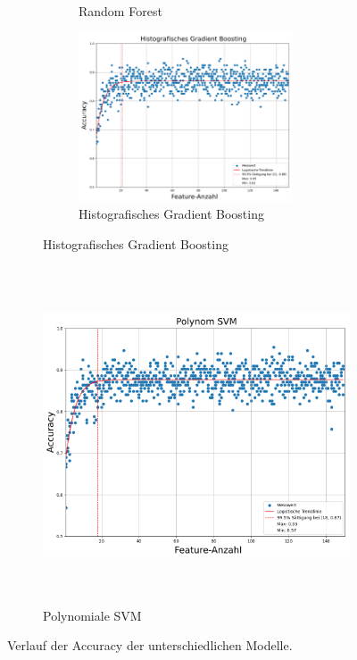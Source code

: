 \begin{figure}[p]
\begin{subfigure}[b]{0.9\textwidth}
\begin{subfigure}[b]{0.49\textwidth}
             \caption{Random Forest}
         \end{subfigure}
         \hfill
         \begin{subfigure}[b]{0.49\textwidth}
             \centering
             \includegraphics[width=\textwidth, height=5cm]{img/Plots/Modell Auswahl/Hist Gradien Boosting - Accuracy Plot.png}
             \caption{Histografisches Gradient Boosting}
         \end{subfigure}
     \end{subfigure}
     \begin{subfigure}[b]{0.9\textwidth}
         \centering
         \includegraphics[width=\textwidth, height=10cm]{img/Plots/Modell Auswahl/poly SVM - Accuracy Plot.png}
         \caption{Polynomiale SVM}
     \end{subfigure}
     \caption{Verlauf der Accuracy der unterschiedlichen Modelle.}
     \label{fig:plotCompModel}
\end{figure}

